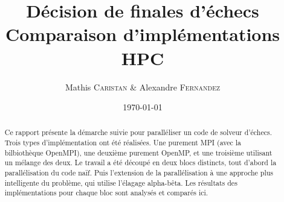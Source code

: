 \documentclass[12pt]{article}
\title{Décision de finales d'échecs\\ Comparaison d'implémentations \\ HPC} %
\author{Mathis \textsc{Caristan} \& Alexandre \textsc{Fernandez}} %
\date{\today} %
\begin{document}
\maketitle %

\begin{abstract}
    Ce rapport présente la démarche suivie pour paralléliser un code de solveur d'échecs.
    Trois types d'implémentation ont été réalisées.
    Une purement MPI (avec la bilbiothèque OpenMPI), une deuxième purement OpenMP,
    et une troisième utilisant un mélange des deux.
    Le travail a été découpé en deux blocs distincts, tout d'abord la parallélisation
    du code \og naïf\fg. Puis l'extension de la parallélisation à une approche plus
    intelligente du problème, qui utilise \og l'élagage alpha-bêta\fg.
    Les résultats des implémentations pour chaque bloc sont analysés et comparés ici.
\end{abstract}

\end{document}
